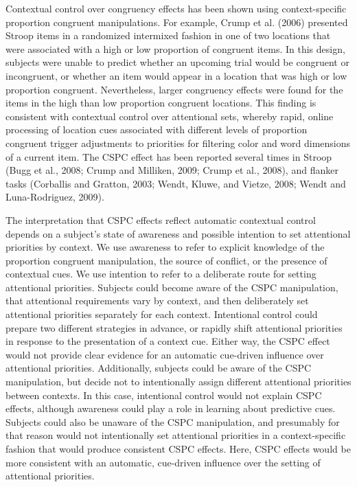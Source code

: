 \documentclass[]{DissertateCUNY}
\begin{document}
Contextual control over congruency effects has been shown using
context-specific proportion congruent manipulations. For example, Crump
et al. (2006) presented Stroop items in a randomized intermixed fashion
in one of two locations that were associated with a high or low
proportion of congruent items. In this design, subjects were unable to
predict whether an upcoming trial would be congruent or incongruent, or
whether an item would appear in a location that was high or low
proportion congruent. Nevertheless, larger congruency effects were found
for the items in the high than low proportion congruent locations. This
finding is consistent with contextual control over attentional sets,
whereby rapid, online processing of location cues associated with
different levels of proportion congruent trigger adjustments to
priorities for filtering color and word dimensions of a current item.
The CSPC effect has been reported several times in Stroop (Bugg et al.,
2008; Crump and Milliken, 2009; Crump et al., 2008), and flanker tasks
(Corballis and Gratton, 2003; Wendt, Kluwe, and Vietze, 2008; Wendt and
Luna-Rodriguez, 2009).

The interpretation that CSPC effects reflect automatic contextual
control depends on a subject's state of awareness and possible intention
to set attentional priorities by context. We use awareness to refer to
explicit knowledge of the proportion congruent manipulation, the source
of conflict, or the presence of contextual cues. We use intention to
refer to a deliberate route for setting attentional priorities. Subjects
could become aware of the CSPC manipulation, that attentional
requirements vary by context, and then deliberately set attentional
priorities separately for each context. Intentional control could
prepare two different strategies in advance, or rapidly shift
attentional priorities in response to the presentation of a context cue.
Either way, the CSPC effect would not provide clear evidence for an
automatic cue-driven influence over attentional priorities.
Additionally, subjects could be aware of the CSPC manipulation, but
decide not to intentionally assign different attentional priorities
between contexts. In this case, intentional control would not explain
CSPC effects, although awareness could play a role in learning about
predictive cues. Subjects could also be unaware of the CSPC
manipulation, and presumably for that reason would not intentionally set
attentional priorities in a context-specific fashion that would produce
consistent CSPC effects. Here, CSPC effects would be more consistent
with an automatic, cue-driven influence over the setting of attentional
priorities.
\end{document}
